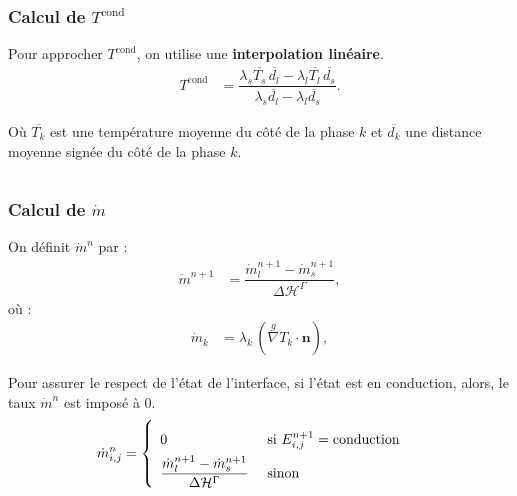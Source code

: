 \documentclass{beamer}
\newcommand{\cond}{\text{cond}}
\newcommand{\vect}[1]{\bm{#1}}
\newcommand{\norm}{\vect{n}}
\newcommand{\npl}{{n+1}}
\newcommand{\ghost}{\overset{{g}}{\nabla}}
\renewcommand{\frac}{\dfrac}
\newcommand{\Frac}{\displaystyle\frac}
\begin{document}
\begin{frame}
    \frametitle{Calcul de $ T^{\cond}$}
    \footnotesize
Pour approcher $T^{\text{cond}}$, on  utilise une \textbf{interpolation linéaire}.
    \begin{align}
    T^{\text{cond}} &= \Frac{\lambda_s \overline{T_s} \, \overline{d_l} - \lambda_l \overline{T_l}  \, \overline{d_s}}{\lambda_s \overline{d_l} - \lambda_l \overline{d_s}}.
\end{align}

Où $\overline{T_k}$ est une température moyenne du côté de la phase $k$ et  $\overline{d_k}$ une distance moyenne signée du côté de la phase $k$.
\begin{columns}[c]
    \begin{column}{0.5 \textwidth}
\begin{center}
		\begin{tikzpicture}[scale = 0.55, every node/.style={scale=0.55}]
			
		\end{tikzpicture}

\end{center}
\end{column}
    \begin{column}{0.5 \textwidth}

\begin{center}
		\begin{tikzpicture}[scale = 0.5, every node/.style={scale=0.5}]
			
		\end{tikzpicture}

\end{center}
   \end{column}
   \end{columns}
\end{frame}


\begin{frame}
    \frametitle{Calcul de $\Dot{m}$}
	\footnotesize
On définit $\Dot{m}^n$ par : 
\begin{align} \label{eq:mPoint}
	\Dot{m}^\npl &= \frac{\Dot{m}_l^\npl - \Dot{m}_s^\npl}{\Delta \mathcal{H}^\Gamma},
\end{align}
où :
\begin{align} \label{eq:mPointk}
	\Dot{m}_k &= \lambda_k \, (\ghost T_k \cdot \norm),
\end{align}

Pour assurer le respect de l'état de l'interface, si l'état est en conduction, alors, le taux $\Dot{m}^n$ est imposé à $0$.
\begin{align}
	\Dot{m}^n_{i,j} &= \left\{ {\renewcommand{\arraystretch}{2}\begin{array}{l l} 
	0 &\text{ si } E_{i,j}^\npl = \text{conduction}\\
	\frac{\Dot{m}_l^\npl - \Dot{m}_s^\npl}{\Delta \mathcal{H}^\Gamma} &\text{ sinon }
	\end{array}}\right.	
\end{align}

\end{frame}
\end{document}
